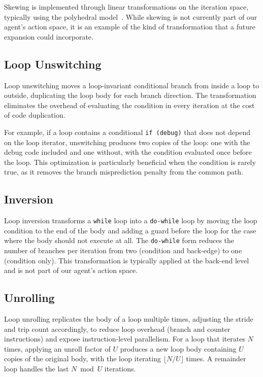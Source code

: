 Skewing is implemented through linear transformations on the iteration space, typically using the polyhedral model~\cite{bacon1993compiler}. While skewing is not currently part of our agent's action space, it is an example of the kind of transformation that a future expansion could incorporate.

\subsection{Loop Unswitching}

Loop unswitching moves a loop-invariant conditional branch from inside a loop to outside, duplicating the loop body for each branch direction. The transformation eliminates the overhead of evaluating the condition in every iteration at the cost of code duplication.

For example, if a loop contains a conditional \texttt{if (debug)} that does not depend on the loop iterator, unswitching produces two copies of the loop: one with the debug code included and one without, with the condition evaluated once before the loop. This optimization is particularly beneficial when the condition is rarely true, as it removes the branch misprediction penalty from the common path.

\subsection{Inversion}

Loop inversion transforms a \texttt{while} loop into a \texttt{do-while} loop by moving the loop condition to the end of the body and adding a guard before the loop for the case where the body should not execute at all. The \texttt{do-while} form reduces the number of branches per iteration from two (condition and back-edge) to one (condition only). This transformation is typically applied at the back-end level and is not part of our agent's action space.

\subsection{Unrolling}

Loop unrolling replicates the body of a loop multiple times, adjusting the stride and trip count accordingly, to reduce loop overhead (branch and counter instructions) and expose instruction-level parallelism. For a loop that iterates $N$ times, applying an unroll factor of $U$ produces a new loop body containing $U$ copies of the original body, with the loop iterating $\lfloor N/U \rfloor$ times. A remainder loop handles the last $N \bmod U$ iterations.

